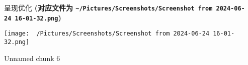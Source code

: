 \documentclass[
  ignorenonframetext,
]{beamer}
\begin{document}
\begin{frame}[fragile]{呈现优化}
\textbf{(对应文件为
\texttt{\textasciitilde{}/Pictures/Screenshots/Screenshot\ from\ 2024-06-24\ 16-01-32.png})}

\def\@captype{figure}
\begin{center}
\texttt{[image: ~/Pictures/Screenshots/Screenshot from 2024-06-24 16-01-32.png]}
\caption{Unnamed chunk 6}\label{fig:unnamed-chunk-6}
\end{center}

\begin{center}\vspace{1.5cm}\end{center}
\end{frame}
\end{document}
